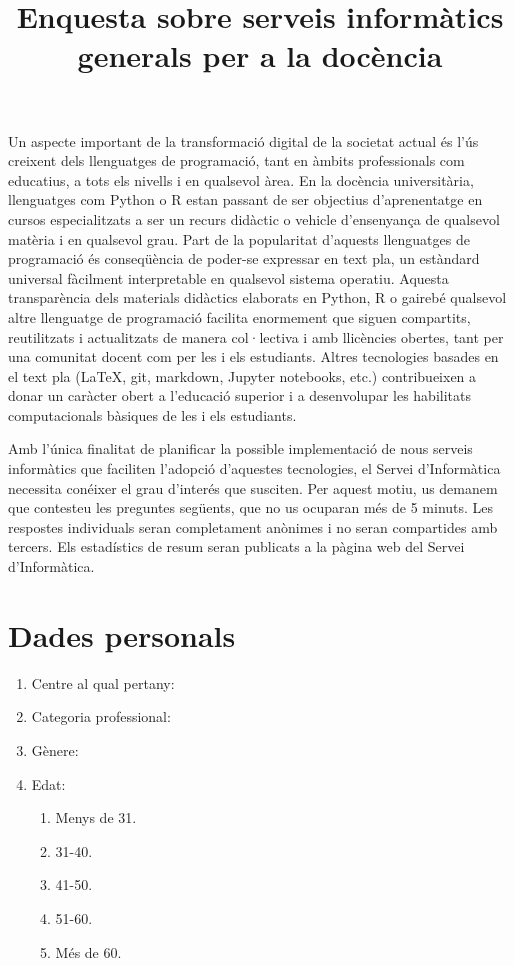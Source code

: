 \documentclass[a4paper,12pt]{article}
\title{Enquesta sobre serveis informàtics generals per a la docència}
\newcounter{preg}[section]
\begin{document}
\maketitle
Un aspecte important de la transformació digital de la societat actual és l'ús creixent
dels llenguatges de programació, tant en àmbits professionals com educatius, a tots els
nivells i en qualsevol àrea. En la docència universitària, llenguatges com Python o R
estan passant de ser objectius d'aprenentatge en cursos especialitzats a ser un recurs
didàctic o vehicle d'ensenyança de qualsevol matèria i en qualsevol grau. Part de la
popularitat d'aquests llenguatges
de programació és conseqüència de poder-se expressar en text pla, un estàndard
universal fàcilment interpretable en qualsevol sistema operatiu. Aquesta
transparència dels materials didàctics elaborats en Python, R o gairebé qualsevol altre
llenguatge de programació facilita enormement que siguen compartits, reutilitzats i
actualitzats de manera col·lectiva i amb llicències obertes, tant per una comunitat docent
com per les i els estudiants. Altres tecnologies basades en el text pla (\LaTeX, git,
markdown, Jupyter notebooks, etc.) contribueixen a donar un caràcter obert a l'educació superior
i a desenvolupar les habilitats computacionals bàsiques de les i els estudiants.

Amb l'única finalitat de planificar la possible implementació de nous serveis informàtics que
faciliten l'adopció d'aquestes tecnologies, el Servei d'Informàtica necessita conéixer el
grau d'interés que susciten. Per aquest motiu, us demanem que contesteu les preguntes següents,
que no us ocuparan més de 5 minuts. Les respostes individuals seran completament anònimes i no seran
compartides amb tercers. Els estadístics de resum seran publicats a la pàgina web del Servei
d'Informàtica.

\section{Dades personals}
\setcounter{preg}{1}

\begin{enumerate}
\item {} Centre al qual pertany:
\item {} Categoria professional:
\item {} Gènere:
\item {} Edat:
   \begin{enumerate}
   \item Menys de 31.
   \item 31-40.
   \item 41-50.
   \item 51-60.
   \item Més de 60.
   \end{enumerate}
\end{enumerate}
\end{document}
